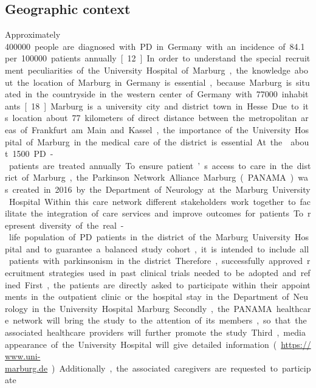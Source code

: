 \subsection{Geographic context}
Approximately \SI{400000} people are diagnosed with \ac{PD} in Germany with an incidence of \SI{84.1} per \SI{100000} patients annually [12]. In order to understand the special recruitment peculiarities of the University Hospital of Marburg, the knowledge about the location of Marburg in Germany is essential, because Marburg is situated in the countryside in the western center of Germany with \SI{77000} inhabitants [18]. Marburg is a university city and district town in Hesse. Due to its location about 77 kilometers of direct distance between the metropolitan areas of Frankfurt am Main and Kassel, the importance of the University Hospital of Marburg in the medical care of the district is essential. At the \UKGM about 1500 PD-patients are treated annually. To ensure patient’s access to care in the district of Marburg, the Parkinson Network Alliance Marburg (PANAMA) was created in 2016 by the Department of Neurology at the Marburg University Hospital. Within this care network different stakeholders work together to facilitate the integration of care services and improve outcomes for patients. 

To represent diversity of the real-life population of PD patients in the district of the Marburg University Hospital and to guarantee a balanced study cohort, it is intended to include all patients with parkinsonism in the district. Therefore, successfully approved recruitment strategies used in past clinical trials needed to be adopted and refined. First, the patients are directly asked to participate within their appointments in the outpatient clinic or the hospital stay in the Department of Neurology in the University Hospital Marburg. Secondly, the PANAMA healthcare network will bring the study to the attention of its members, so that the associated healthcare providers will further promote the study. Third, media appearance of the University Hospital will give detailed information (\url{https://www.uni-marburg.de}). Additionally, the associated caregivers are requested to participate. 

\newpage
{}
